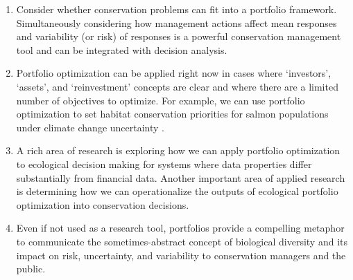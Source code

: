 \begin{enumerate}
\def\labelenumi{\arabic{enumi}.}
\item
  Consider whether conservation problems can fit into a portfolio framework. Simultaneously considering how management actions affect mean responses and variability (or risk) of responses is a powerful conservation management tool and can be integrated with decision analysis.
\item
  Portfolio optimization can be applied right now in cases where `investors', `assets', and `reinvestment' concepts are clear and where there are a limited number of objectives to optimize. For example, we can use portfolio optimization to set habitat conservation priorities for salmon populations under climate change uncertainty \citep{anderson2014}.
\item
  A rich area of research is exploring how we can apply portfolio optimization to ecological decision making for systems where data properties differ substantially from financial data. Another important area of applied research is determining how we can operationalize the outputs of ecological portfolio optimization into conservation decisions.
\item
  Even if not used as a research tool, portfolios provide a compelling metaphor to communicate the sometimes-abstract concept of biological diversity and its impact on risk, uncertainty, and variability to conservation managers and the public.
\end{enumerate}


